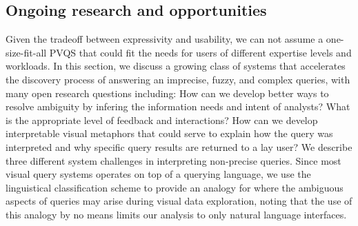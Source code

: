 \subsection{Ongoing research and opportunities}
\par Given the tradeoff between expressivity and usability, we can not assume a one-size-fit-all PVQS that could fit the needs for users of different expertise levels and workloads. In this section, we discuss a growing class of systems that accelerates the discovery process of answering an imprecise, fuzzy, and complex queries, with many open research questions including: How can we develop better ways to resolve ambiguity by infering the information needs and intent of analysts? What is the appropriate level of feedback and interactions? How can we develop interpretable visual metaphors that could serve to explain how the query was interpreted and why specific query results are returned to a lay user? We describe three different system challenges in interpreting non-precise queries. Since most visual query systems operates on top of a querying language, we use the linguistical classification scheme to provide an analogy for where the ambiguous aspects of queries may arise during visual data exploration, noting that the use of this analogy by no means limits our analysis to only natural language interfaces.


